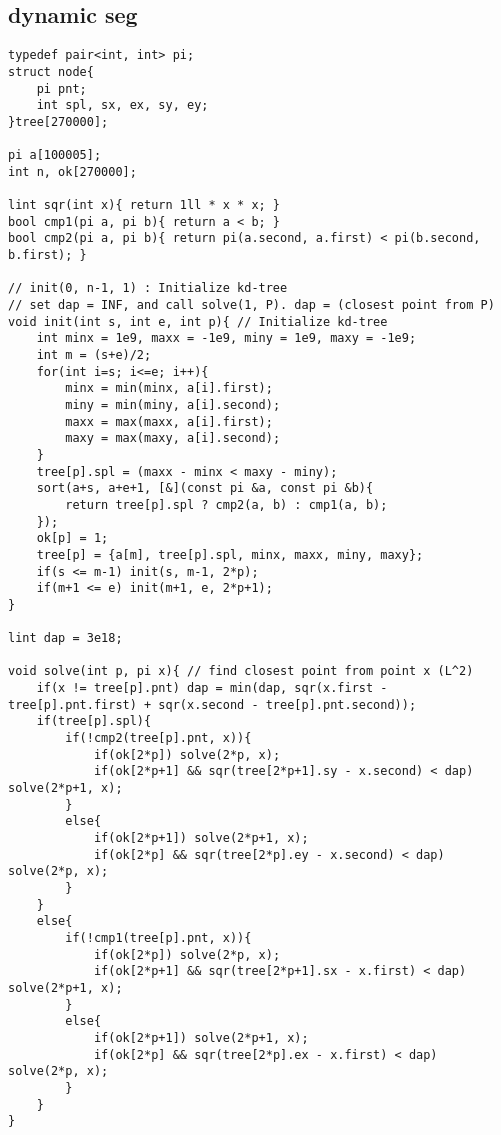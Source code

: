 \documentclass[landscape, 8pt, a4paper, oneside, twocolumn]{extarticle}
\begin{document}
\subsection{dynamic seg}
\begin{verbatim}
typedef pair<int, int> pi;
struct node{
	pi pnt;
	int spl, sx, ex, sy, ey;
}tree[270000];

pi a[100005];
int n, ok[270000];

lint sqr(int x){ return 1ll * x * x; }
bool cmp1(pi a, pi b){ return a < b; }
bool cmp2(pi a, pi b){ return pi(a.second, a.first) < pi(b.second, b.first); }

// init(0, n-1, 1) : Initialize kd-tree
// set dap = INF, and call solve(1, P). dap = (closest point from P)
void init(int s, int e, int p){ // Initialize kd-tree
	int minx = 1e9, maxx = -1e9, miny = 1e9, maxy = -1e9;
	int m = (s+e)/2;
	for(int i=s; i<=e; i++){
		minx = min(minx, a[i].first);
		miny = min(miny, a[i].second);
		maxx = max(maxx, a[i].first);
		maxy = max(maxy, a[i].second);
	}
	tree[p].spl = (maxx - minx < maxy - miny);
	sort(a+s, a+e+1, [&](const pi &a, const pi &b){
		return tree[p].spl ? cmp2(a, b) : cmp1(a, b);
	});
	ok[p] = 1;
	tree[p] = {a[m], tree[p].spl, minx, maxx, miny, maxy};
	if(s <= m-1) init(s, m-1, 2*p);
	if(m+1 <= e) init(m+1, e, 2*p+1);
}

lint dap = 3e18;

void solve(int p, pi x){ // find closest point from point x (L^2)
	if(x != tree[p].pnt) dap = min(dap, sqr(x.first - tree[p].pnt.first) + sqr(x.second - tree[p].pnt.second));
	if(tree[p].spl){
		if(!cmp2(tree[p].pnt, x)){
			if(ok[2*p]) solve(2*p, x);
			if(ok[2*p+1] && sqr(tree[2*p+1].sy - x.second) < dap) solve(2*p+1, x);
		}
		else{
			if(ok[2*p+1]) solve(2*p+1, x);
			if(ok[2*p] && sqr(tree[2*p].ey - x.second) < dap) solve(2*p, x);
		}
	}
	else{
		if(!cmp1(tree[p].pnt, x)){
			if(ok[2*p]) solve(2*p, x);
			if(ok[2*p+1] && sqr(tree[2*p+1].sx - x.first) < dap) solve(2*p+1, x);
		}
		else{
			if(ok[2*p+1]) solve(2*p+1, x);
			if(ok[2*p] && sqr(tree[2*p].ex - x.first) < dap) solve(2*p, x);
		}
	}
}
\end{verbatim}
\end{document}
